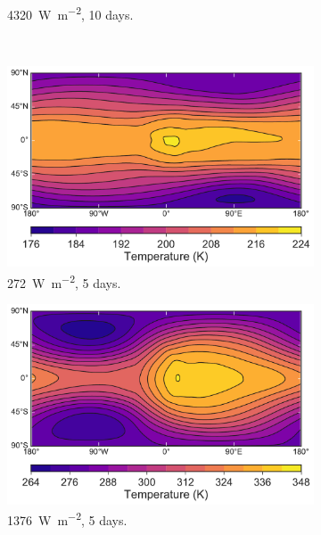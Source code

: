 \begin{figure}
\begin{subfigure}[b]{0.32\textwidth}
    \caption{\SI{4320}{\watt\per\metre\squared}, 10 days.}
    \label{fig:spherical-high-omega}
    \end{subfigure}
    \\
    \begin{subfigure}[b]{0.32\textwidth}
      \includegraphics[width=\textwidth]{figures/wave-mean-flow/ar_lowT_5day.pdf}
    \caption{\SI{272}{\watt\per\metre\squared}, 5 days.}
      \label{fig:spherical-low-omega}
    \end{subfigure}
    \begin{subfigure}[b]{0.32\textwidth}
      \includegraphics[width=\textwidth]{figures/wave-mean-flow/ar_mediumT_5day.pdf}
      \caption{\SI{1376}{\watt\per\metre\squared}, 5 days.}
      \label{fig:spherical-low-omega}
    \end{subfigure}
    \begin{subfigure}[b]{0.32\textwidth}

\end{subfigure}
\end{figure}
